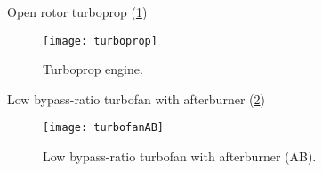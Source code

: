 \begin{itemizePacked}
\item Open rotor turboprop (\cref{FIG_TURBOPROP})

\begin{figure}[!htb!]
 \centering
    {\texttt{[image: turboprop]}}
    \caption{\label{FIG_TURBOPROP}Turboprop engine.}
\end{figure}

\item Low bypass-ratio turbofan with afterburner (\cref{FIG_TURBOFANAB})

\begin{figure}[!htb!]
 \centering
    {\texttt{[image: turbofanAB]}}
    \caption{\label{FIG_TURBOFANAB}Low bypass-ratio turbofan with afterburner (AB).}
\end{figure}

\end{itemizePacked}
